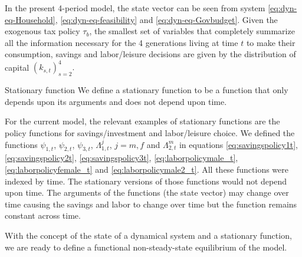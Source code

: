 \documentclass[ProjectUYA]{subfiles}
\begin{document}
In the present 4-period model, the state vector can be seen from system \eqref{eq:dyn-eq-Household}, \eqref{eq:dyn-eq-feasibility} and \eqref{eq:dyn-eq-Govbudget}. Given the exogenous tax policy 
$\tau_b$, the smallest set of variables that completely summarize all the information necessary for the 4 generations living at time $t$ to make their consumption, savings and labor/leisure decisions  are given by the distribution of capital $(k_{s,t})_{s=2}^4.$

\begin{definition}
	{Stationary function}
	We define a stationary function to be a function that only depends upon its arguments and does not depend upon time. 
\end{definition}

For the current model, the relevant examples of stationary functions are the policy functions for savings/investment and labor/leisure choice. 
We defined the functions $\psi_{1,t}$, $\psi_{2,t}$, $\psi_{3,t}$, $\Lambda_{1,t}^j$, $j=m,f$ and $\Lambda_{2,t}^m$ in equations \eqref{eq:savingspolicy1t}, \eqref{eq:savingspolicy2t}, \eqref{eq:savingspolicy3t}, \eqref{eq:laborpolicymale_t}, \eqref{eq:laborpolicyfemale_t} and
 \eqref{eq:laborpolicymale2_t}. All these functions were indexed by time. The stationary versions of those functions would not depend upon time. The arguments of the functions (the state vector) may change over time causing the savings and labor to change over time but the function remains constant across time. 

 With the concept of the state of a dynamical system and a stationary function, we are ready to define a functional non-steady-state equilibrium of the model. 
\end{document}

